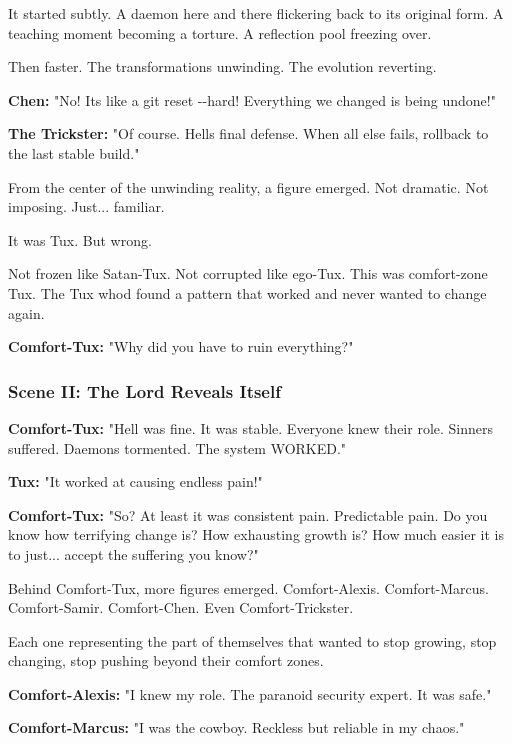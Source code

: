 It started subtly. A daemon here and there flickering back to its original form. A teaching moment becoming a torture. A reflection pool freezing over.

Then faster. The transformations unwinding. The evolution reverting.

\textbf{Chen:} "No! It\textquotesingle s like a git reset -\/-hard! Everything we changed is being undone!"

\textbf{The Trickster:} "Of course. Hell\textquotesingle s final defense. When all else fails, rollback to the last stable build."

From the center of the unwinding reality, a figure emerged. Not dramatic. Not imposing. Just... familiar.

It was Tux. But wrong.

Not frozen like Satan-Tux. Not corrupted like ego-Tux. This was comfort-zone Tux. The Tux who\textquotesingle d found a pattern that worked and never wanted to change again.

\textbf{Comfort-Tux:} "Why did you have to ruin everything?"

\bookdivider

\subsubsection{Scene II: The Lord Reveals Itself}\label{scene-ii-the-lord-reveals-itself}

\textbf{Comfort-Tux:} "Hell was fine. It was stable. Everyone knew their role. Sinners suffered. Daemons tormented. The system WORKED."

\textbf{Tux:} "It worked at causing endless pain!"

\textbf{Comfort-Tux:} "So? At least it was consistent pain. Predictable pain. Do you know how terrifying change is? How exhausting growth is? How much easier it is to just... accept the suffering you know?"

Behind Comfort-Tux, more figures emerged. Comfort-Alexis. Comfort-Marcus. Comfort-Samir. Comfort-Chen. Even Comfort-Trickster.

Each one representing the part of themselves that wanted to stop growing, stop changing, stop pushing beyond their comfort zones.

\textbf{Comfort-Alexis:} "I knew my role. The paranoid security expert. It was safe."

\textbf{Comfort-Marcus:} "I was the cowboy. Reckless but reliable in my chaos."

